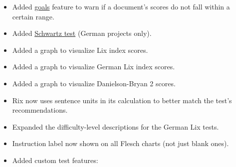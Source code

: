 \documentclass[
]{book}
\providecommand{\tightlist}{%
  \setlength{\itemsep}{0pt}\setlength{\parskip}{0pt}}
\theoremstyle{definition}
\theoremstyle{definition}
\theoremstyle{definition}
\theoremstyle{definition}
\theoremstyle{remark}
\begin{document}
\begin{itemize}
\tightlist
\item
  Added \protect\hyperlink{reviewing-goals}{goals} feature to warn if a document's scores do not fall within a certain range.
\item
  Added \protect\hyperlink{scwartz}{Schwartz test} (German projects only).
\item
  Added a graph to visualize Lix index scores.
\item
  Added a graph to visualize German Lix index scores.
\item
  Added a graph to visualize Danielson-Bryan 2 scores.
\item
  Rix now uses sentence units in its calculation to better match the test's recommendations.
\item
  Expanded the difficulty-level descriptions for the German Lix tests.
\item
  Instruction label now shown on all Flesch charts (not just blank ones).
\item
  Added custom test features:


\end{itemize}
\end{document}

